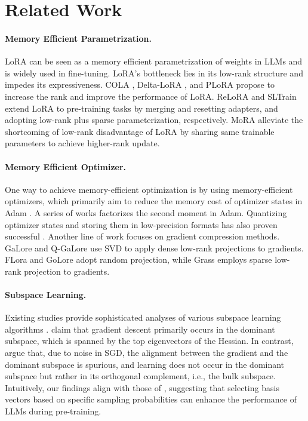 \section{Related Work}\label{sec:related-works}
\paragraph{Memory Efficient Parametrization.}
LoRA \cite{hu2021lora} can be seen as a memory efficient parametrization of weights in LLMs and is widely used in fine-tuning. LoRA's bottleneck lies in its low-rank structure and impedes its expressiveness. COLA \citep{xia2024chain}, Delta-LoRA \citep{zi2023delta}, and PLoRA \citep{meng2024periodiclora} propose to increase the rank and improve the performance of LoRA. ReLoRA \cite{lialin2023relora} and SLTrain \cite{han2024sltrain} extend LoRA to pre-training tasks by merging and resetting adapters, and adopting low-rank plus sparse parameterization, respectively. MoRA \citep{jiang2024mora} alleviate the shortcoming of low-rank disadvantage of LoRA by sharing same trainable parameters to achieve higher-rank update. 



\paragraph{Memory Efficient Optimizer.}
One way to achieve memory-efficient optimization is by using memory-efficient optimizers, which primarily aim to reduce the memory cost of optimizer states in Adam \cite{kingma2014adam}. A series of works \citep{shazeer2018adafactor, zhang2024adam-mini, luo2023came, zhao2024adapprox} factorizes the second moment in Adam. Quantizing optimizer states and storing them in low-precision formats has also proven successful \citep{li2024memory, dettmers20218}. Another line of work focuses on gradient compression methods. GaLore \cite{zhao2024galore} and Q-GaLore \cite{zhang2024q-galore} use SVD to apply dense low-rank projections to gradients. FLora \cite{hao2024flora} and GoLore \cite{he2024subspace} adopt random projection, while Grass \cite{muhamed2024grass} employs sparse low-rank projection to gradients.


\paragraph{Subspace Learning.}
Existing studies provide sophisticated analyses of various subspace learning algorithms \citep{cosson2023low, kozak2019stochastic, jadbabaie2023adaptive}. \cite{gur2018gradient} claim that gradient descent primarily occurs in the dominant subspace, which is spanned by the top eigenvectors of the Hessian. In contrast, \cite{song2024does} argue that, due to noise in SGD, the alignment between the gradient and the dominant subspace is spurious, and learning does not occur in the dominant subspace but rather in its orthogonal complement, i.e., the bulk subspace. Intuitively, our findings align with those of \cite{song2024does}, suggesting that selecting basis vectors based on specific sampling probabilities can enhance the performance of LLMs during pre-training.





